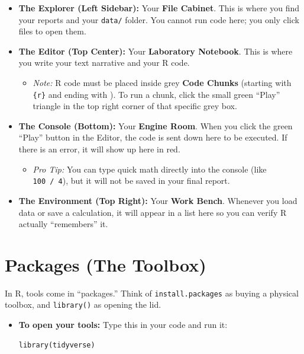 \documentclass[
  letterpaper,
  DIV=11,
  numbers=noendperiod,
  oneside]{scrreprt}
\providecommand{\tightlist}{%
  \setlength{\itemsep}{0pt}\setlength{\parskip}{0pt}}
\begin{document}
\begin{itemize}
\tightlist
\item
  \textbf{The Explorer (Left Sidebar):} Your \textbf{File Cabinet}. This
  is where you find your reports and your \texttt{data/} folder. You
  cannot run code here; you only click files to open them.
\item
  \textbf{The Editor (Top Center):} Your \textbf{Laboratory Notebook}.
  This is where you write your text narrative and your R code.

  \begin{itemize}
  \tightlist
  \item
    \emph{Note:} R code must be placed inside grey \textbf{Code Chunks}
    (starting with
    \texttt{\textasciigrave{}\textasciigrave{}\textasciigrave{}\{r\}}
    and ending with
    \texttt{\textasciigrave{}\textasciigrave{}\textasciigrave{}}). To
    run a chunk, click the small green ``Play'' triangle in the top
    right corner of that specific grey box.
  \end{itemize}
\item
  \textbf{The Console (Bottom):} Your \textbf{Engine Room}. When you
  click the green ``Play'' button in the Editor, the code is sent down
  here to be executed. If there is an error, it will show up here in
  red.

  \begin{itemize}
  \tightlist
  \item
    \emph{Pro Tip:} You can type quick math directly into the console
    (like \texttt{100\ /\ 4}), but it will not be saved in your final
    report.
  \end{itemize}
\item
  \textbf{The Environment (Top Right):} Your \textbf{Work Bench}.
  Whenever you load data or save a calculation, it will appear in a list
  here so you can verify R actually ``remembers'' it.
\end{itemize}

\chapter{Packages (The Toolbox)}\label{packages-the-toolbox}

In R, tools come in ``packages.'' Think of \texttt{install.packages} as
buying a physical toolbox, and \texttt{library()} as opening the lid.

\begin{itemize}
\item
  \textbf{To open your tools:} Type this in your code and run it:

\begin{verbatim}
library(tidyverse) 
\end{verbatim}
\end{itemize}
\end{document}

